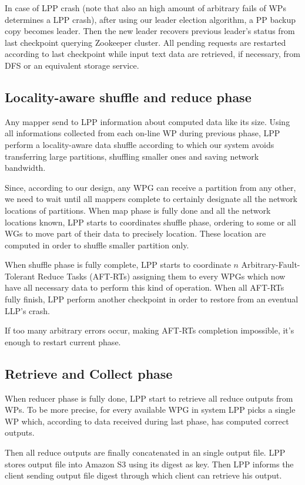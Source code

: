 \documentclass[sigchi]{acmart}
\begin{document}
In case of LPP crash (note that also an high amount of arbitrary fails of WPs determines a LPP crash), after using our leader election algorithm, a PP backup copy becomes leader. Then the new leader recovers previous leader's status from last checkpoint querying Zookeeper cluster. All pending requests are restarted according to last checkpoint while input text data are retrieved, if necessary, from DFS or an equivalent storage service. 

\subsection{Locality-aware shuffle and reduce phase}

Any mapper send to LPP information about computed data like its size. Using all informations collected from each on-line WP during previous phase, LPP perform a locality-aware data shuffle according to which our system avoids transferring large partitions, shuffling smaller ones and saving network bandwidth.

Since, according to our design, any WPG can receive a partition from any other, we need to wait until all mappers complete to certainly designate all the network locations of partitions. When map phase is fully done and all the network locations known, LPP starts to coordinates shuffle phase, ordering to some or all WGs to move part of their data to precisely location. These location are computed in order to shuffle smaller partition only. 

When shuffle phase is fully complete, LPP starts to coordinate $n$ Arbitrary-Fault-Tolerant Reduce Tasks (AFT-RTs) assigning them to every WPGs which now have all necessary data to perform this kind of operation. When all AFT-RTs fully finish, LPP perform another checkpoint in order to restore from an eventual LLP's crash.

If too many arbitrary errors occur, making AFT-RTs completion impossible, it's enough to restart current phase.

\subsection{Retrieve and Collect phase}

When reducer phase is fully done, LPP start to retrieve all reduce outputs from WPs. To be more precise, for every available WPG in system LPP picks a single WP which, according to data received during last phase, has computed correct outputs.

Then all reduce outputs are finally concatenated in an single output file. LPP stores output file into Amazon S3 using its digest as key. Then LPP informs the client sending output file digest through which client can retrieve his output.






\appendix
\end{document}
